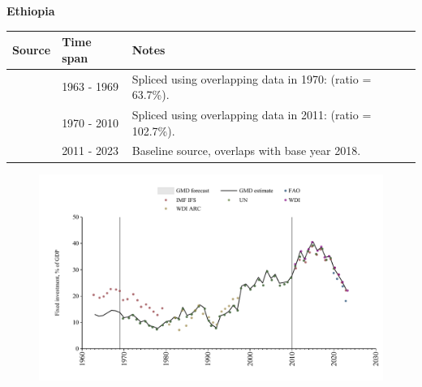 \documentclass[12pt,a4paper,landscape]{article}
\begin{document}
\begin{adjustbox}{max totalsize={\paperwidth}{\paperheight},center}
\begin{minipage}[t][\textheight][t]{\textwidth}
\vspace*{0.5cm}
{}
\begin{center}
{\Large\bfseries Ethiopia}
\end{center}
\vspace{0.5cm}
\begin{table}[H]
\centering
\small
\begin{tabular}{|l|l|l|}
\hline
\textbf{Source} & \textbf{Time span} & \textbf{Notes} \\
\hline
\rowcolor{white}\cite{IMF_IFS}& 1963 - 1969 &Spliced using overlapping data in 1970: (ratio = 63.7\%).\\
\rowcolor{lightgray}\cite{UN}& 1970 - 2010 &Spliced using overlapping data in 2011: (ratio = 102.7\%).\\
\rowcolor{white}\cite{WDI}& 2011 - 2023 &Baseline source, overlaps with base year 2018.\\
\hline
\end{tabular}
\end{table}
\begin{figure}[H]
\centering
\includegraphics[width=\textwidth,height=0.6\textheight,keepaspectratio]{graphs/ETH_finv_GDP.pdf}
\end{figure}
\end{minipage}
\end{adjustbox}
\end{document}
